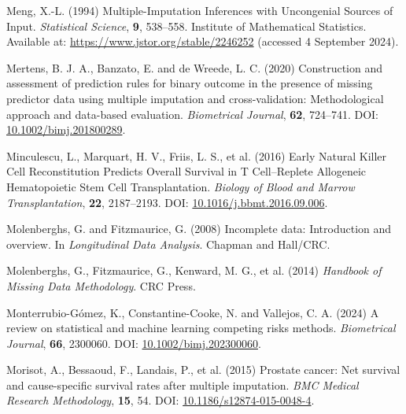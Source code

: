 \documentclass[
  letterpaper,
  paper=240mm:170mm,
  twoside=true,
  open=right,
  fontsize=10pt,
  pagesize=false,
  BCOR=15mm,
  DIV=14,
  headinclude=true,
  footinclude=false,
  headsepline=on]{scrbook}
\newlength{\cslhangindent}
\newenvironment{CSLReferences}[2] %
 {\begin{list}{}{%
  \setlength{\itemindent}{0pt}
  \setlength{\leftmargin}{0pt}
  \setlength{\parsep}{0pt}
  \ifodd #1
   \setlength{\leftmargin}{\cslhangindent}
   \setlength{\itemindent}{-1\cslhangindent}
  \fi
  \setlength{\itemsep}{#2\baselineskip}}}
 {\end{list}}
\begin{document}
\begin{CSLReferences}{1}{1}
Meng, X.-L. (1994) Multiple-{Imputation Inferences} with {Uncongenial
Sources} of {Input}. \emph{Statistical Science}, \textbf{9}, 538--558.
Institute of Mathematical Statistics. Available at:
\url{https://www.jstor.org/stable/2246252} (accessed 4 September 2024).

Mertens, B. J. A., Banzato, E. and de Wreede, L. C. (2020) Construction
and assessment of prediction rules for binary outcome in the presence of
missing predictor data using multiple imputation and cross-validation:
{Methodological} approach and data-based evaluation. \emph{Biometrical
Journal}, \textbf{62}, 724--741. DOI:
\href{https://doi.org/10.1002/bimj.201800289}{10.1002/bimj.201800289}.

Minculescu, L., Marquart, H. V., Friis, L. S., et al. (2016) Early
{Natural Killer Cell Reconstitution Predicts Overall Survival} in {T
Cell}--{Replete Allogeneic Hematopoietic Stem Cell Transplantation}.
\emph{Biology of Blood and Marrow Transplantation}, \textbf{22},
2187--2193. DOI:
\href{https://doi.org/10.1016/j.bbmt.2016.09.006}{10.1016/j.bbmt.2016.09.006}.

Molenberghs, G. and Fitzmaurice, G. (2008) Incomplete data:
{Introduction} and overview. In \emph{Longitudinal {Data Analysis}}.
{Chapman and Hall/CRC}.

Molenberghs, G., Fitzmaurice, G., Kenward, M. G., et al. (2014)
\emph{Handbook of {Missing Data Methodology}}. CRC Press.

Monterrubio-Gómez, K., Constantine-Cooke, N. and Vallejos, C. A. (2024)
A review on statistical and machine learning competing risks methods.
\emph{Biometrical Journal}, \textbf{66}, 2300060. DOI:
\href{https://doi.org/10.1002/bimj.202300060}{10.1002/bimj.202300060}.

Morisot, A., Bessaoud, F., Landais, P., et al. (2015) Prostate cancer:
Net survival and cause-specific survival rates after multiple
imputation. \emph{BMC Medical Research Methodology}, \textbf{15}, 54.
DOI:
\href{https://doi.org/10.1186/s12874-015-0048-4}{10.1186/s12874-015-0048-4}.


\end{CSLReferences}
\end{document}
